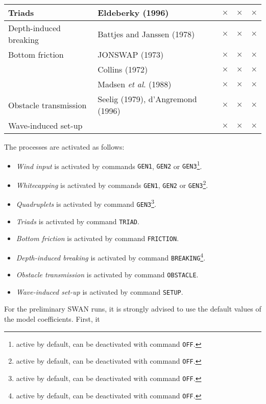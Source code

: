 \documentclass[12pt]{book}
\begin{document}
\begin{table}[htb]
\begin{center}
\begin{tabular}{|l | l | c | c | c|}
\hline
Triads                  & Eldeberky (1996)                       & $\times$ & $\times$ & $\times$ \\
\hline
Depth-induced breaking  & Battjes and Janssen (1978)             & $\times$ & $\times$ & $\times$ \\
\hline
Bottom friction         & JONSWAP (1973)                         & $\times$ & $\times$ & $\times$ \\
\cline{2-5}
                        & Collins (1972)                         & $\times$ & $\times$ & $\times$ \\
\cline{2-5}
                        & Madsen {\it et al}. (1988)             & $\times$ & $\times$ & $\times$ \\
\hline
Obstacle transmission   & Seelig (1979), d'Angremond (1996)      & $\times$ & $\times$ & $\times$ \\
\hline
Wave-induced set-up     &                                        & $\times$ & $\times$ & $\times$ \\
\hline
\end{tabular}
\end{center}
\end{table}
\noindent
The processes are activated as follows:
\begin{itemize}
  \item {\it Wind input} is activated by commands {\tt GEN1}, {\tt GEN2} or {\tt GEN3}\footnote{active by default, can be deactivated with command {\tt OFF}.}.
  \item {\it Whitecapping} is activated by commands {\tt GEN1}, {\tt GEN2} or {\tt GEN3}\footnote{active by default, can be deactivated with command {\tt OFF}.}.
  \item {\it Quadruplets} is activated by command {\tt GEN3}\footnote{active by default, can be deactivated with command {\tt OFF}.}.
  \item {\it Triads} is activated by command {\tt TRIAD}.
  \item {\it Bottom friction} is activated by command {\tt FRICTION}.
  \item {\it Depth-induced breaking} is activated by command {\tt BREAKING}\footnote{active by default, can be deactivated with command {\tt OFF}.}.
  \item {\it Obstacle transmission} is activated by command {\tt OBSTACLE}.
  \item {\it Wave-induced set-up} is activated by command {\tt SETUP}.
\end{itemize}
For the preliminary SWAN runs, it is strongly advised to use the default values of the model coefficients. First, it
\end{document}

